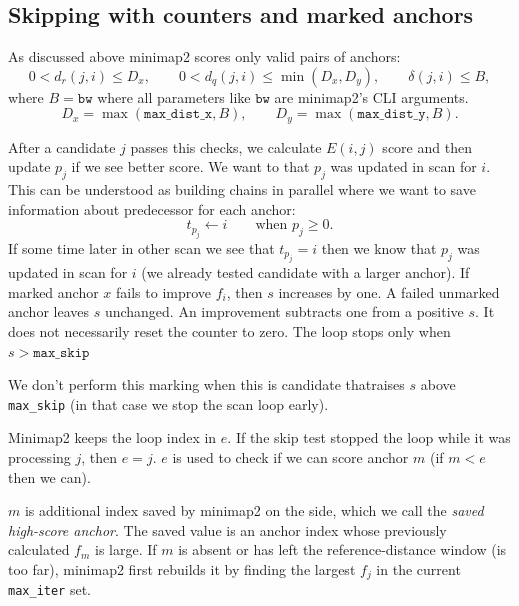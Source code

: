 \subsection{Skipping with counters and marked anchors}

As discussed above minimap2 scores only valid pairs of anchors:
\begin{equation}
  0<d_r(j,i)\leq D_x,\qquad
  0<d_q(j,i)\leq\min(D_x,D_y),\qquad
  \delta(j,i)\leq B,
  \label{eq:chaining-b1-pair-checks}
\end{equation}
where \(B=\texttt{bw}\) where all parameters like $\texttt{bw}$ are minimap2's CLI arguments.
\[
  D_x=\max(\texttt{max\_dist\_x},B),\qquad
  D_y=\max(\texttt{max\_dist\_y},B).
\]

After a candidate \(j\) passes this checks, we calculate $E(i,j)$ score and then update $p_j$ if we see better score. We want to that $p_j$ was updated in scan for $i$. This can be understood as building chains in parallel where we want to save information about predecessor for each anchor:
\[
  t_{p_j}\gets i \qquad\text{when }p_j\geq0.
\]
If some time later in other scan we see that $t_{p_j}=i$ then we know that $p_j$ was updated in scan for $i$ (we already tested candidate with a larger anchor). If marked anchor \(x\)
fails to improve \(f_i\), then \(s\) increases by one. A failed unmarked anchor leaves \(s\) unchanged. An improvement subtracts one from a positive
\(s\). It does not necessarily reset the counter to zero. The loop stops only when
\(s>\texttt{max\_skip}\)


We don't perform this marking when this is candidate thatraises \(s\) above
\texttt{max\_skip} (in that case we stop the scan loop early).

Minimap2 keeps the loop index in \(e\). If the skip
test stopped the loop while it was processing \(j\), then \(e=j\). $e$ is used to check if we can score anchor $m$ (if $m<e$ then we can).

\(m\) is additional index saved by minimap2 on the side, which we call the
\emph{saved high-score anchor}. The saved value is
an anchor index whose previously calculated \(f_m\) is large. If \(m\) is absent or has left the reference-distance window (is too far),
minimap2 first rebuilds it by finding the largest \(f_j\) in the current
\texttt{max\_iter} set.

